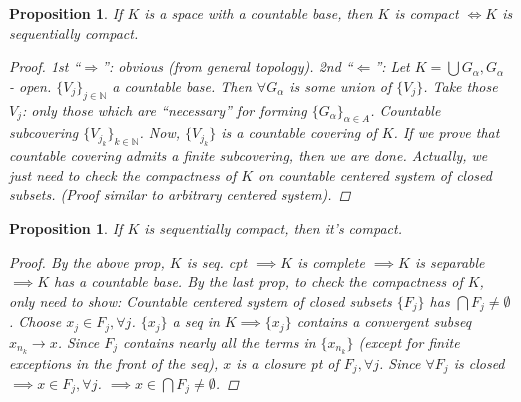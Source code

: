 \documentclass[12pt]{article}
\theoremstyle{blueplain}
\newtheorem{proposition}[theorem]{Proposition}
\theoremstyle{bluedef}
\theoremstyle{blueremark}
\newcommand{\N}{\mathbb{N}}
\numberwithin{equation}{section}
\begin{document}
      \begin{proposition}
        If $K$ is a space with a countable base, then $K$ is compact $\iff K$ is sequentially compact.
        \begin{proof}
          1st ``$\Rightarrow$'': obvious (from general topology).
          2nd ``$\Leftarrow$'': Let $K = \bigcup G_\alpha, G_\alpha$ - open.
          $\{V_j\}_{j \in \N}$ a countable base.
          Then $\forall G_\alpha$ is some union of $\{V_j\}$.
          Take those $V_j$: only those which are ``necessary'' for forming $\{G_\alpha\}_{\alpha \in A}$.
          Countable subcovering $\{V_{j_k}\}_{k \in \N}$.
          Now, $\{V_{j_k}\}$ is a countable covering of $K$.
          If we prove that countable covering admits a finite subcovering, then we are done.
          Actually, we just need to check the compactness of $K$ on countable centered system of closed subsets.
          (Proof similar to arbitrary centered system).
        \end{proof}
      \end{proposition}

      \begin{proposition}
        If $K$ is sequentially compact, then it's compact.
        \begin{proof}
          By the above prop, $K$ is seq. cpt $\implies K$ is complete $\implies K$ is separable $\implies K$ has a countable base.
          By the last prop, to check the compactness of $K$, only need to show:
          Countable centered system of closed subsets $\{F_j\}$ has $\bigcap F_j \neq \emptyset$.
          Choose $x_j \in F_j, \forall j$.
          $\{x_j\}$ a seq in $K \implies \{x_j\}$ contains a convergent subseq $x_{n_k} \to x$.
          Since $F_j$ contains nearly all the terms in $\{x_{n_k}\}$ (except for finite exceptions in the front of the seq), $x$ is a closure pt of $F_j, \forall j$.
          Since $\forall F_j$ is closed $\implies x \in F_j, \forall j$.
          $\implies x \in \bigcap F_j \neq \emptyset$.
        \end{proof}
      \end{proposition}
\end{document}
